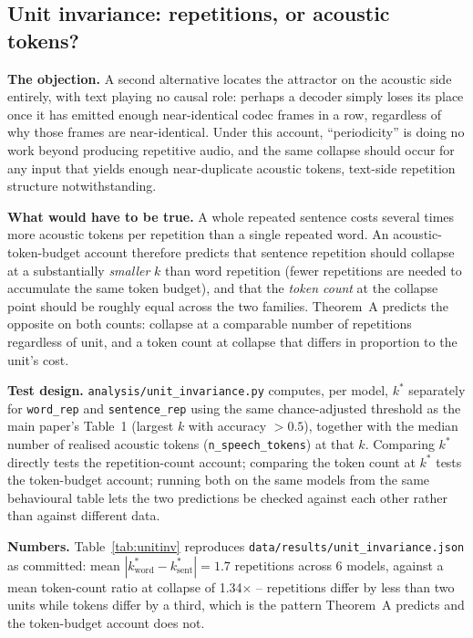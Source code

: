 \documentclass[11pt]{article}
\begin{document}
\subsection{Unit invariance: repetitions, or acoustic tokens?}
\label{sec:s8-unit}

\textbf{The objection.} A second alternative locates the attractor on the
acoustic side entirely, with text playing no causal role: perhaps a decoder
simply loses its place once it has emitted enough near-identical codec frames
in a row, regardless of why those frames are near-identical. Under this
account, ``periodicity'' is doing no work beyond producing repetitive audio,
and the same collapse should occur for any input that yields enough
near-duplicate acoustic tokens, text-side repetition structure notwithstanding.

\textbf{What would have to be true.} A whole repeated sentence costs several
times more acoustic tokens per repetition than a single repeated word. An
acoustic-token-budget account therefore predicts that sentence repetition
should collapse at a substantially \emph{smaller} $k$ than word repetition
(fewer repetitions are needed to accumulate the same token budget), and that
the \emph{token count} at the collapse point should be roughly equal across
the two families. Theorem~A predicts the opposite on both counts: collapse at
a comparable number of repetitions regardless of unit, and a token count at
collapse that differs in proportion to the unit's cost.

\textbf{Test design.} \texttt{analysis/unit\_invariance.py} computes, per
model, $k^\ast$ separately for \texttt{word\_rep} and \texttt{sentence\_rep}
using the same chance-adjusted threshold as the main paper's Table~1 (largest
$k$ with accuracy $>0.5$), together with the median number of realised
acoustic tokens (\texttt{n\_speech\_tokens}) at that $k$. Comparing $k^\ast$
directly tests the repetition-count account; comparing the token count at
$k^\ast$ tests the token-budget account; running both on the same models from
the same behavioural table lets the two predictions be checked against each
other rather than against different data.

\textbf{Numbers.} Table~\ref{tab:unitinv} reproduces
\texttt{data/results/unit\_invariance.json} as committed: mean
$|k^\ast_{\mathrm{word}} - k^\ast_{\mathrm{sent}}| = 1.7$ repetitions
across 6 models, against a mean token-count ratio at collapse of
1.34$\times$ -- repetitions differ by less than two units while
tokens differ by a third, which is the pattern Theorem~A predicts and the
token-budget account does not.
\end{document}
